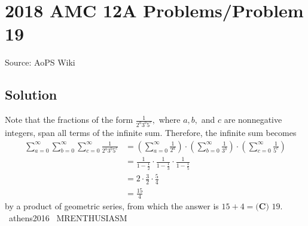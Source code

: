 \documentclass[12pt]{article}
\begin{document}
\section*{{2018 AMC 12A Problems/Problem 19}}
Source: AoPS Wiki

\subsection*{Solution}
Note that the fractions of the form $\frac{1}{2^a3^b5^c},$ where $a,b,$ and $c$ are nonnegative integers, span all terms of the infinite sum. Therefore, the infinite sum becomes \begin{align*} \sum_{a=0}^{\infty}\sum_{b=0}^{\infty}\sum_{c=0}^{\infty}\frac{1}{2^a3^b5^c} &= \left(\sum_{a=0}^{\infty}\frac{1}{2^a}\right)\cdot\left(\sum_{b=0}^{\infty}\frac{1}{3^b}\right)\cdot\left(\sum_{c=0}^{\infty}\frac{1}{5^c}\right) \\ &= \frac{1}{1-\frac12}\cdot\frac{1}{1-\frac13}\cdot\frac{1}{1-\frac15} \\ &= 2\cdot\frac32\cdot\frac54 \\ &= \frac{15}{4} \end{align*} by a product of geometric series, from which the answer is $15+4=\boxed{\textbf{(C) } 19}.$ ~athens2016 ~MRENTHUSIASM
\end{document}
